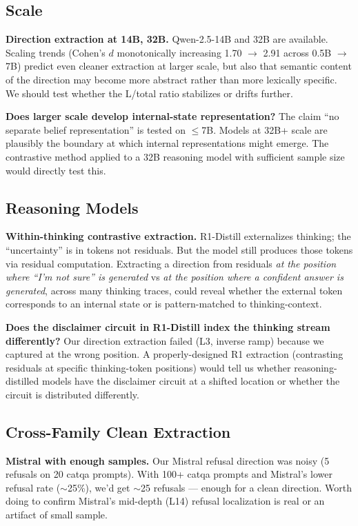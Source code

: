 \documentclass[11pt,a4paper]{article}
\begin{document}
\subsection{Scale}

\textbf{Direction extraction at 14B, 32B.} Qwen-2.5-14B and 32B are available. Scaling trends (Cohen's $d$ monotonically increasing 1.70 $\to$ 2.91 across 0.5B $\to$ 7B) predict even cleaner extraction at larger scale, but also that semantic content of the direction may become more abstract rather than more lexically specific. We should test whether the L/total ratio stabilizes or drifts further.

\textbf{Does larger scale develop internal-state representation?} The claim ``no separate belief representation'' is tested on $\leq$7B. Models at 32B+ scale are plausibly the boundary at which internal representations might emerge. The contrastive method applied to a 32B reasoning model with sufficient sample size would directly test this.

\subsection{Reasoning Models}

\textbf{Within-thinking contrastive extraction.} R1-Distill externalizes thinking; the ``uncertainty'' is in tokens not residuals. But the model still produces those tokens via residual computation. Extracting a direction from residuals \emph{at the position where ``I'm not sure'' is generated} vs \emph{at the position where a confident answer is generated}, across many thinking traces, could reveal whether the external token corresponds to an internal state or is pattern-matched to thinking-context.

\textbf{Does the disclaimer circuit in R1-Distill index the thinking stream differently?} Our direction extraction failed (L3, inverse ramp) because we captured at the wrong position. A properly-designed R1 extraction (contrasting residuals at specific thinking-token positions) would tell us whether reasoning-distilled models have the disclaimer circuit at a shifted location or whether the circuit is distributed differently.

\subsection{Cross-Family Clean Extraction}

\textbf{Mistral with enough samples.} Our Mistral refusal direction was noisy (5 refusals on 20 catqa prompts). With 100+ catqa prompts and Mistral's lower refusal rate ($\sim$25\%), we'd get $\sim$25 refusals --- enough for a clean direction. Worth doing to confirm Mistral's mid-depth (L14) refusal localization is real or an artifact of small sample.
\end{document}
